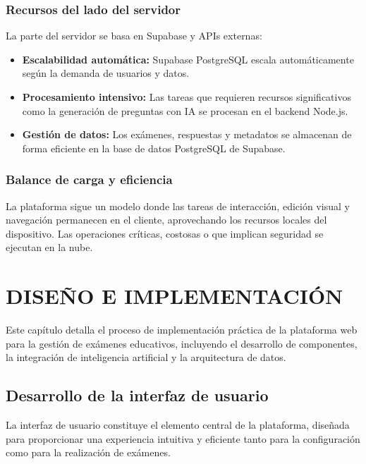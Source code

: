 \documentclass[12pt,a4paper]{report}
\begin{document}
\subsection{Recursos del lado del servidor}

La parte del servidor se basa en Supabase y APIs externas:

\begin{itemize}
\item \textbf{Escalabilidad automática:} Supabase PostgreSQL escala automáticamente según la demanda de usuarios y datos.

\item \textbf{Procesamiento intensivo:} Las tareas que requieren recursos significativos como la generación de preguntas con IA se procesan en el backend Node.js.

\item \textbf{Gestión de datos:} Los exámenes, respuestas y metadatos se almacenan de forma eficiente en la base de datos PostgreSQL de Supabase.
\end{itemize}

\subsection{Balance de carga y eficiencia}

La plataforma sigue un modelo donde las tareas de interacción, edición visual y navegación permanecen en el cliente, aprovechando los recursos locales del dispositivo. Las operaciones críticas, costosas o que implican seguridad se ejecutan en la nube.

\chapter{DISEÑO E IMPLEMENTACIÓN}

Este capítulo detalla el proceso de implementación práctica de la plataforma web para la gestión de exámenes educativos, incluyendo el desarrollo de componentes, la integración de inteligencia artificial y la arquitectura de datos.

\section{Desarrollo de la interfaz de usuario}

La interfaz de usuario constituye el elemento central de la plataforma, diseñada para proporcionar una experiencia intuitiva y eficiente tanto para la configuración como para la realización de exámenes.
\end{document}
